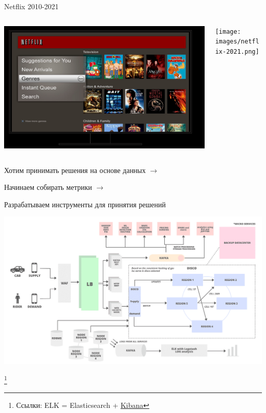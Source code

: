 \documentclass[11pt,aspectratio=169]{beamer}
\begin{document}
\begin{frame}{Netflix 2010-2021 \cite{NETFLIXAB}}

\begin{columns}
\begin{column}{0.45\textwidth}
   \begin{center}
		\includegraphics[scale=0.15]{images/netflix-2010.png}
   \end{center}
\end{column}
\begin{column}{0.45\textwidth}
   \begin{center}
		\texttt{[image: images/netflix-2021.png]}
   \end{center}
\end{column}
\end{columns}

\end{frame}

\begin{frame}{}

Хотим принимать решения на основе данных $\rightarrow$ 

\qquad Начинаем собирать метрики $\rightarrow$ 

\qquad \qquad Разрабатываем инструменты для принятия решений

\begin{center}
\includegraphics[scale=0.18]{images/uber.png}
\end{center}

\footnote{Ссылки: ELK = Elasticsearch + \href{https://www.elastic.co/kibana/}{Kibana}}

\end{frame}
\end{document}
